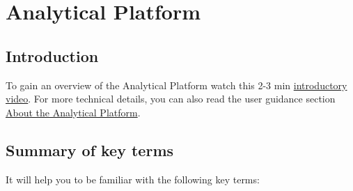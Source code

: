 \documentclass[
]{book}
\begin{document}
\hypertarget{AP}{%
\chapter{Analytical Platform}\label{AP}}

\hypertarget{introduction}{%
\section{Introduction}\label{introduction}}

To gain an overview of the Analytical Platform watch this 2-3 min \href{https://www.youtube.com/watch?v=5467Hl3X9EI\&t=95s}{introductory video}. For more technical details, you can also read the user guidance section \href{https://user-guidance.services.alpha.mojanalytics.xyz/about.html\#about-the-analytical-platform}{About the Analytical Platform}.

\hypertarget{summary-of-key-terms}{%
\section{Summary of key terms}\label{summary-of-key-terms}}

It will help you to be familiar with the following key terms:
\end{document}
